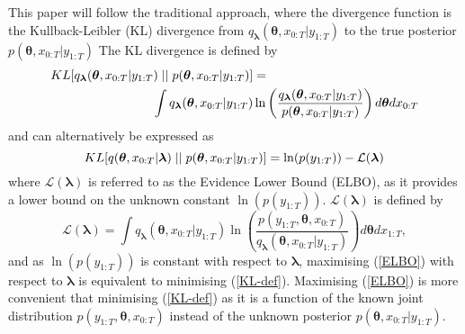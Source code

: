 \documentclass[12pt,a4paper]{article}%
\numberwithin{equation}{section}
\begin{document}
This paper will follow the traditional approach, where the divergence function is the Kullback-Leibler (KL) divergence \citep{Kullback1951} from $q_{\boldsymbol{\lambda}}(\boldsymbol{\theta}, x_{0:T} | y_{1:T})$ to the true posterior $p(\boldsymbol{\theta}, x_{0:T} | y_{1:T})$ The KL divergence is defined by
\begin{align}
\label{KL-def}
KL[q_{\boldsymbol{\lambda}}(\boldsymbol{\theta}, x_{0:T} | y_{1:T})\hspace{.1cm}||\hspace{.1cm}p(\boldsymbol{\theta}, x_{0:T} | y_{1:T})] &= \nonumber \\
\int q_{\boldsymbol{\lambda}}(\boldsymbol{\theta}, x_{0:T} | y_{1:T}) &\ln \left( \frac{q_{\boldsymbol{\lambda}}(\boldsymbol{\theta}, x_{0:T} | y_{1:T})}{p(\boldsymbol{\theta}, x_{0:T} |y_{1:T})}\right) d\boldsymbol{\theta} dx_{0:T}
\end{align}
and can alternatively be expressed as
\begin{equation}
\label{KL-ELBO}
KL[q(\boldsymbol{\theta}, x_{0:T} | \boldsymbol{\lambda})\hspace{.1cm}||\hspace{.1cm}p(\boldsymbol{\theta}, x_{0:T} | y_{1:T})] = \ln(p(y_{1:T})) - \mathcal{L}(\boldsymbol{\lambda})
\end{equation}
where $\mathcal{L}(\boldsymbol{\lambda})$ is referred to as the Evidence Lower Bound (ELBO), as it provides a lower bound on the unknown constant $\ln(p(y_{1:T}))$.  $\mathcal{L}(\boldsymbol{\lambda})$ is defined by
\begin{equation}
\label{ELBO}
\mathcal{L}(\boldsymbol{\lambda}) = \int q_{\boldsymbol{\lambda}}(\boldsymbol{\theta}, x_{0:T} | y_{1:T}) \ln \left( \frac{p(y_{1:T},\boldsymbol{\theta}, x_{0:T})}{q_{\boldsymbol{\lambda}}(\boldsymbol{\theta}, x_{0:T} | y_{1:T})} \right) d\boldsymbol{\theta}dx_{1:T},
\end{equation}
and as $\ln(p(y_{1:T}))$ is constant with respect to $\boldsymbol{\lambda}$, maximising (\ref{ELBO}) with respect to $\boldsymbol{\lambda}$ is equivalent to minimising (\ref{KL-def}). Maximising (\ref{ELBO}) is more convenient that minimising (\ref{KL-def}) as it is a function of the known joint distribution $p(y_{1:T}, \boldsymbol{\theta}, x_{0:T})$ instead of the unknown posterior $p(\boldsymbol{\theta}, x_{0:T} | y_{1:T})$.
\end{document}
